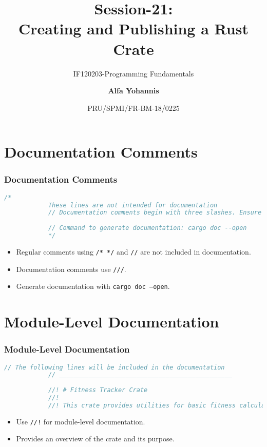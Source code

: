 \documentclass[aspectratio=169, table]{beamer}
\subtitle{IF120203-Programming Fundamentals}
\title{Session-21:\\\LARGE{Creating and Publishing a Rust Crate}\\ \vspace{10pt}}
\date[Serial]{\scriptsize {PRU/SPMI/FR-BM-18/0225}}
\author[Pradita]{\small{\textbf{Alfa Yohannis}}}
\begin{document}
	
	\frame{\titlepage}
	
	\begin{frame}
		\tableofcontents
	\end{frame}
	
	\section{Documentation Comments}
	\begin{frame}[fragile]
		\frametitle{Documentation Comments}
		\begin{lstlisting}[language=Rust]
			/* 
			These lines are not intended for documentation
			// Documentation comments begin with three slashes. Ensure your code is error-free and well-documented before publishing.
			
			// Command to generate documentation: cargo doc --open
			*/
		\end{lstlisting}
		\begin{itemize}
			\item Regular comments using \texttt{/* */} and \texttt{//} are not included in documentation.
			\item Documentation comments use \texttt{///}.
			\item Generate documentation with \texttt{cargo doc --open}.
		\end{itemize}
	\end{frame}
	
	\section{Module-Level Documentation}
	\begin{frame}[fragile]
		\frametitle{Module-Level Documentation}
		\begin{lstlisting}[language=Rust]
			// The following lines will be included in the documentation 
			// _______________________________________________
			
			//! # Fitness Tracker Crate
			//! 
			//! This crate provides utilities for basic fitness calculations and metrics.
		\end{lstlisting}
		\begin{itemize}
			\item Use \texttt{//!} for module-level documentation.
			\item Provides an overview of the crate and its purpose.
		\end{itemize}
	\end{frame}
	
\end{document}
